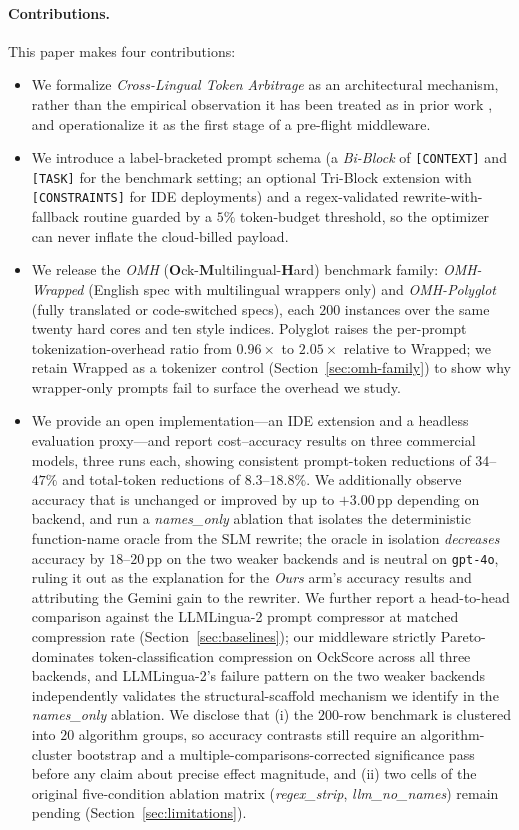 \documentclass[11pt,a4paper,twocolumn]{article}
\begin{document}
\paragraph{Contributions.} This paper makes four contributions:
\begin{itemize}
    \item We formalize \textit{Cross-Lingual Token Arbitrage} as an architectural mechanism, rather than the empirical observation it has been treated as in prior work \cite{ahuja2025efficientxlang}, and operationalize it as the first stage of a pre-flight middleware.
    \item We introduce a label-bracketed prompt schema (a \textit{Bi-Block} of \texttt{[CONTEXT]} and \texttt{[TASK]} for the benchmark setting; an optional Tri-Block extension with \texttt{[CONSTRAINTS]} for IDE deployments) and a regex-validated rewrite-with-fallback routine guarded by a $5\%$ token-budget threshold, so the optimizer can never inflate the cloud-billed payload.
    \item We release the \textit{OMH} (\textbf{O}ck-\textbf{M}ultilingual-\textbf{H}ard) benchmark family: \textit{OMH-Wrapped} (English spec with multilingual wrappers only) and \textit{OMH-Polyglot} (fully translated or code-switched specs), each $200$ instances over the same twenty hard cores and ten style indices. Polyglot raises the per-prompt tokenization-overhead ratio from $0.96\times$ to $2.05\times$ relative to Wrapped; we retain Wrapped as a tokenizer control (Section~\ref{sec:omh-family}) to show why wrapper-only prompts fail to surface the overhead we study.
    \item We provide an open implementation---an IDE extension and a headless evaluation proxy---and report cost--accuracy results on three commercial models, three runs each, showing consistent prompt-token reductions of $34$--$47\%$ and total-token reductions of $8.3$--$18.8\%$. We additionally observe accuracy that is unchanged or improved by up to $+3.00$\,pp depending on backend, and run a \textit{names\_only} ablation that isolates the deterministic function-name oracle from the SLM rewrite; the oracle in isolation \emph{decreases} accuracy by $18$--$20$\,pp on the two weaker backends and is neutral on \texttt{gpt-4o}, ruling it out as the explanation for the \textit{Ours} arm's accuracy results and attributing the Gemini gain to the rewriter. We further report a head-to-head comparison against the LLMLingua-2 \cite{pan2024llmlingua2} prompt compressor at matched compression rate (Section~\ref{sec:baselines}); our middleware strictly Pareto-dominates token-classification compression on OckScore across all three backends, and LLMLingua-2's failure pattern on the two weaker backends independently validates the structural-scaffold mechanism we identify in the \textit{names\_only} ablation. We disclose that (i) the $200$-row benchmark is clustered into $20$ algorithm groups, so accuracy contrasts still require an algorithm-cluster bootstrap and a multiple-comparisons-corrected significance pass before any claim about precise effect magnitude, and (ii) two cells of the original five-condition ablation matrix (\textit{regex\_strip}, \textit{llm\_no\_names}) remain pending (Section~\ref{sec:limitations}).
\end{itemize}
\end{document}
